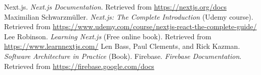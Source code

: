 \renewcommand\bibname{Ашигласан материал}
\begin{thebibliography}{99}	
	Next.js. \textit{Next.js Documentation}. Retrieved from \url{https://nextjs.org/docs}
	Maximilian Schwarzmüller. \textit{Next.js: The Complete Introduction} (Udemy course). Retrieved from \url{https://www.udemy.com/course/nextjs-react-the-complete-guide/}
	Lee Robinson. \textit{Learning Next.js} (Free online book). Retrieved from \url{https://www.learnnextjs.com/}
	Len Bass, Paul Clements, and Rick Kazman. \textit{Software Architecture in Practice} (Book).
	Firebase. \textit{Firebase Documentation}. Retrieved from \url{https://firebase.google.com/docs}	
\end{thebibliography}